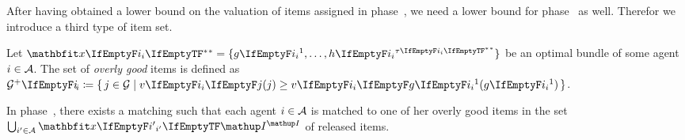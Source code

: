 After having obtained a lower bound on the valuation of items assigned in phase~\phaseii, we need a lower bound for phase~\phaseiii{} as well.
Therefor we introduce a third type of item set.
\begin{definition}
	Let \(\alloc* = \{ \asgd*{1}, \dots, \asgd{\alloclen*}\}\) be an optimal bundle of some agent \(i \in \mathcal{A}\).
	The set of \emph{overly good} items is defined as \(\overlygoodset \coloneq \{\, j \in \goods \given \valuations[j] \ge \valuations[\asgd*{1}] \,\}\).
\end{definition}

\begin{lemma}
	\label{lem:overly_good_matching}
	In phase~\phaseiii, there exists a matching such that each agent \(i \in \mathcal{A}\) is matched to one of her overly good items in the set \(\bigcup_{i' \in \agents} \alloc[\phasei][i']\) of released items.
\end{lemma}
